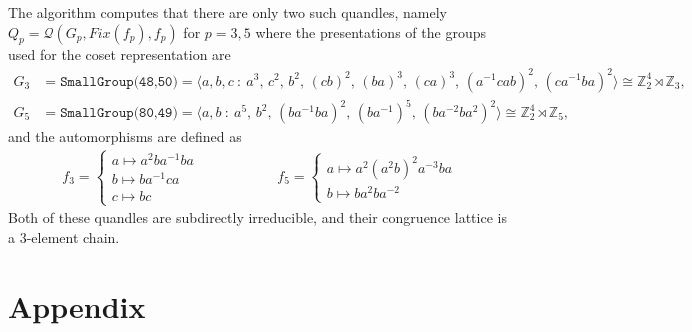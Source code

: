 \documentclass[a4paper, english, 9pt]{amsart}
\theoremstyle{plain}
\newtheorem{lemma}[theorem]{Lemma}
\theoremstyle{definition}
\def\ker#1{\mathrm{ker}(#1)}
\def\aut#1{\mathrm{Aut}(#1)}
\def\comment#1{{\color{red} #1}}
\def\Z{\mathbb Z}
\begin{document}
   The algorithm computes that there are only two such quandles, namely $Q_p=\mathcal{Q}(G_p,Fix(f_p),f_p)$ for $p=3,5$ where the presentations of the groups used for the coset representation are
   \begin{align*}
       G_3 &= \texttt{SmallGroup(48,50)} = \langle a, b, c \ \colon\ 
        a^{3} ,\,
        c^{2} ,\,
        b^{2} ,\,
        (c b)^{2} ,\,
        (b a)^{3} ,\,
        (c a)^{3} ,\,
        (a^{-1} c a b)^{2} ,\,
        (c a^{-1} b a)^{2} 
        \rangle \cong \Z_2^4\rtimes \Z_3,\\ G_5 &= \texttt{SmallGroup(80,49)}=\langle a, b \ \colon \ 
        a^{5} ,\,
        b^{2} ,\,
        (b a^{-1} b a)^{2} ,\, 
        (b a^{-1})^{5} ,\, 
        (b a^{-2} b a^{2})^{2} 
        \rangle\cong \Z_2^4\rtimes \Z_5,
        \end{align*}
    and the automorphisms are defined as
\[
    \begin{aligned}
    f_3 = \begin{cases}
    a \mapsto a^2ba^{-1}ba \\
    b \mapsto ba^{-1}ca \\
    c \mapsto bc
    \end{cases}
    \end{aligned}
    \hspace{2cm}
    \begin{aligned}
    f_5 = \begin{cases}
    a \mapsto a^{2} (a^{2} b)^{2} a^{-3} b a \\
    b \mapsto b a^{2} b a^{-2}
    \end{cases}
    \end{aligned}
    \]  
   Both of these quandles are subdirectly irreducible, and their congruence lattice is a 3-element chain. 
    



\section{Appendix}  \label{sec:appendix}




\end{document}
